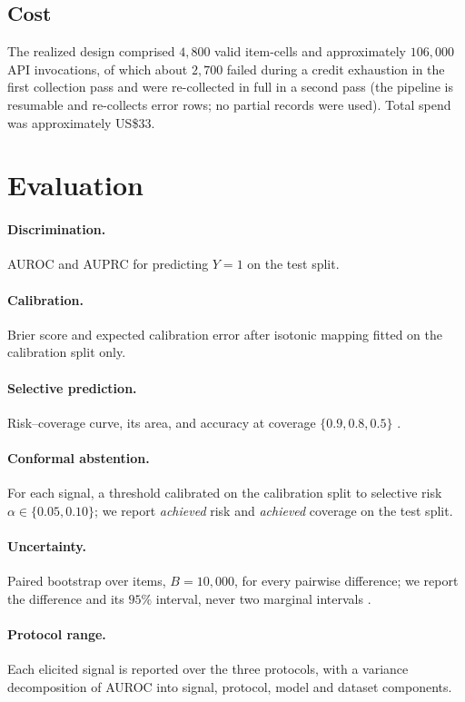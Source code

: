 \documentclass[11pt]{article}
\begin{document}
\subsection{Cost}
The realized design comprised $4{,}800$ valid item-cells and approximately $106{,}000$ API
invocations, of which about $2{,}700$ failed during a credit exhaustion in the first collection
pass and were re-collected in full in a second pass (the pipeline is resumable and re-collects
error rows; no partial records were used). Total spend was approximately US\$33.

\section{Evaluation}
\label{sec:eval}

\paragraph{Discrimination.} AUROC and AUPRC for predicting $Y=1$ on the test split.
\paragraph{Calibration.} Brier score and expected calibration error after isotonic mapping fitted
on the calibration split only.
\paragraph{Selective prediction.} Risk--coverage curve, its area, and accuracy at coverage
$\{0.9,0.8,0.5\}$ \citep{geifman2017selective}.
\paragraph{Conformal abstention.} For each signal, a threshold calibrated on the calibration
split to selective risk $\alpha\in\{0.05,0.10\}$; we report \emph{achieved} risk and
\emph{achieved} coverage on the test split.
\paragraph{Uncertainty.} Paired bootstrap over items, $B=10{,}000$, for every pairwise
difference; we report the difference and its $95\%$ interval, never two marginal intervals
\citep{miller2024adding}.
\paragraph{Protocol range.} Each elicited signal is reported over the three protocols, with a
variance decomposition of AUROC into signal, protocol, model and dataset components.
\end{document}
